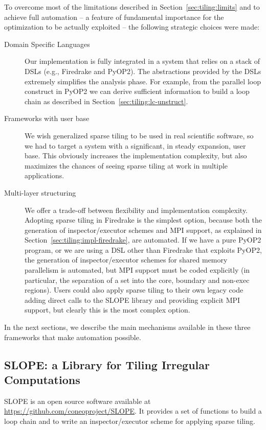 To overcome most of the limitations described in Section~\ref{sec:tiling:limits} and to achieve full automation -- a feature of fundamental importance for the optimization to be actually exploited -- the following strategic choices were made:
\begin{description}
\item[Domain Specific Languages] Our implementation is fully integrated in a system that relies on a stack of DSLs (e.g., Firedrake and PyOP2). The abstractions provided by the DSLs extremely simplifies the analysis phase. For example, from the parallel loop construct in PyOP2 we can derive sufficient information to build a loop chain as described in Section~\ref{sec:tiling:lc-unstruct}.
\item[Frameworks with user base] We wish generalized sparse tiling to be used in real scientific software, so we had to target a system with a significant, in steady expansion, user base. This obviously increases the implementation complexity, but also maximizes the chances of seeing sparse tiling at work in multiple applications.
\item[Multi-layer structuring] We offer a trade-off between flexibility and implementation complexity. Adopting sparse tiling in Firedrake is the simplest option, because both the generation of inspector/executor schemes and MPI support, as explained in Section~\ref{sec:tiling:impl-firedrake}, are automated. If we have a pure PyOP2 program, or we are using a DSL other than Firedrake that exploits PyOP2, the generation of inspector/executor schemes for shared memory parallelism is automated, but MPI support must be coded explicitly (in particular, the separation of a set into the core, boundary and non-exec regions). Users could also apply sparse tiling to their own legacy code adding direct calls to the SLOPE library and providing explicit MPI support, but clearly this is the most complex option.
\end{description}

In the next sections, we describe the main mechanisms available in these three frameworks that make automation possible.

\subsection{SLOPE: a Library for Tiling Irregular Computations}
SLOPE is an open source software available at \url{https://github.com/coneoproject/SLOPE}. It provides a set of functions to build a loop chain and to write an inspector/executor scheme for applying sparse tiling. 


